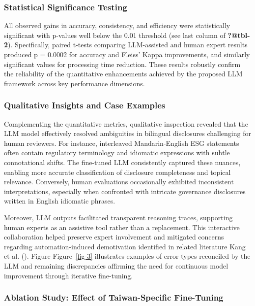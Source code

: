 \documentclass[
  12pt,
]{article}
\begin{document}
\subsubsection{Statistical Significance
Testing}\label{statistical-significance-testing}

All observed gains in accuracy, consistency, and efficiency were
statistically significant with p-values well below the 0.01 threshold
(see last column of \textbf{?@tbl-2}). Specifically, paired t-tests
comparing LLM-assisted and human expert results produced p = 0.0002 for
accuracy and Fleiss' Kappa improvements, and similarly significant
values for processing time reduction. These results robustly confirm the
reliability of the quantitative enhancements achieved by the proposed
LLM framework across key performance dimensions.

\subsubsection{Qualitative Insights and Case
Examples}\label{qualitative-insights-and-case-examples}

Complementing the quantitative metrics, qualitative inspection revealed
that the LLM model effectively resolved ambiguities in bilingual
disclosures challenging for human reviewers. For instance, interleaved
Mandarin-English ESG statements often contain regulatory terminology and
idiomatic expressions with subtle connotational shifts. The fine-tuned
LLM consistently captured these nuances, enabling more accurate
classification of disclosure completeness and topical relevance.
Conversely, human evaluations occasionally exhibited inconsistent
interpretations, especially when confronted with intricate governance
disclosures written in English idiomatic phrases.

Moreover, LLM outputs facilitated transparent reasoning traces,
supporting human experts as an assistive tool rather than a replacement.
This interactive collaboration helped preserve expert involvement and
mitigated concerns regarding automation-induced demotivation identified
in related literature Kang et al. ().
Figure Figure~\ref{fig-3} illustrates examples of error types reconciled
by the LLM and remaining discrepancies affirming the need for continuous
model improvement through iterative fine-tuning.

\subsubsection{Ablation Study: Effect of Taiwan-Specific
Fine-Tuning}\label{ablation-study-effect-of-taiwan-specific-fine-tuning}
\end{document}
